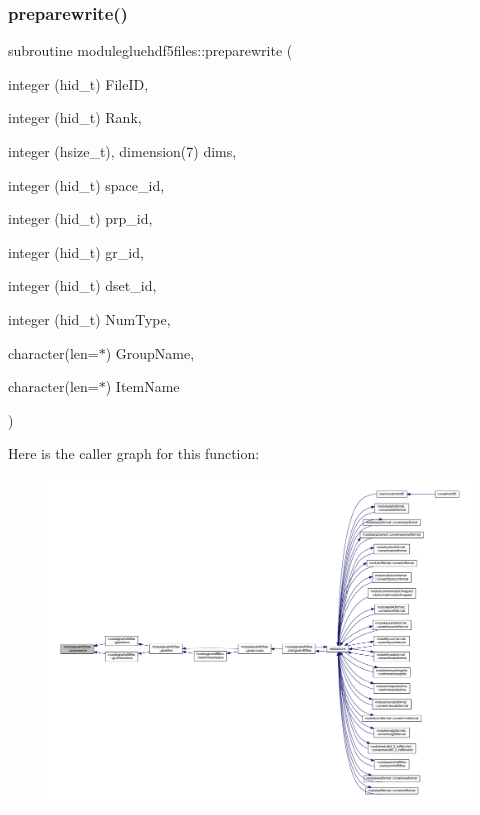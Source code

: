 \subsubsection{\texorpdfstring{preparewrite()}{preparewrite()}}
{\footnotesize\ttfamily subroutine modulegluehdf5files\+::preparewrite (\begin{DoxyParamCaption}\item[{integer (hid\+\_\+t)}]{File\+ID,  }\item[{integer (hid\+\_\+t)}]{Rank,  }\item[{integer (hsize\+\_\+t), dimension(7)}]{dims,  }\item[{integer (hid\+\_\+t)}]{space\+\_\+id,  }\item[{integer (hid\+\_\+t)}]{prp\+\_\+id,  }\item[{integer (hid\+\_\+t)}]{gr\+\_\+id,  }\item[{integer (hid\+\_\+t)}]{dset\+\_\+id,  }\item[{integer (hid\+\_\+t)}]{Num\+Type,  }\item[{character(len=$\ast$)}]{Group\+Name,  }\item[{character(len=$\ast$)}]{Item\+Name }\end{DoxyParamCaption})\hspace{0.3cm}{\ttfamily [private]}}

Here is the caller graph for this function\+:\nopagebreak
\begin{figure}[H]
\begin{center}
\leavevmode
\includegraphics[width=350pt]{namespacemodulegluehdf5files_a2b70cc6d35be5763a50ac4153fb03cc5_icgraph}
\end{center}
\end{figure}
\mbox{\label{namespacemodulegluehdf5files_a0d8abf73fe0fd746139f9d1d9563e66e}} 
